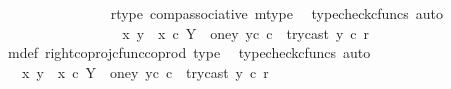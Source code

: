\begin{isabellebody}
\ \ \ \ \ \ \ \ \ \ \ \ \ \ \isamarkupfalse%
\ r{\isacharunderscore}{\kern0pt}type\ comp{\isacharunderscore}{\kern0pt}associative{}\ m{\isacharunderscore}{\kern0pt}type\ \isamarkupfalse%
\ {\isacharparenleft}{\kern0pt}typecheck{\isacharunderscore}{\kern0pt}cfuncs{\isacharcomma}{\kern0pt}\ auto{\isacharparenright}{\kern0pt}\isanewline
\ \ \ \ \ \ \ \ \ \ \ \ \isamarkupfalse%
\ \isamarkupfalse%
\ {\isachardoublequoteopen}{\isachardot}{\kern0pt}{\isachardot}{\kern0pt}{\isachardot}{\kern0pt}\ {\isacharequal}{\kern0pt}\ {\isacharparenleft}{\kern0pt}{\isacharparenleft}{\kern0pt}{\isasymlangle}x{}{\isacharcomma}{\kern0pt}\ y{}{\isasymrangle}\ {\isasymamalg}\ {\isasymlangle}x{}\ {\isasymcirc}\isactrlsub c\ {\isasymbeta}\isactrlbsub Y\ {\isasymsetminus}\ {\isacharparenleft}{\kern0pt}one{\isacharcomma}{\kern0pt}y{}{\isacharparenright}{\kern0pt}\isactrlesub {\isacharcomma}{\kern0pt}\ y{}\isactrlsup c{\isasymrangle}{\isacharparenright}{\kern0pt}\ {\isasymcirc}\isactrlsub c\ \ try{\isacharunderscore}{\kern0pt}cast\ y{}{\isacharparenright}{\kern0pt}\ {\isasymcirc}\isactrlsub c\ r{\isachardoublequoteclose}\isanewline
\ \ \ \ \ \ \ \ \ \ \ \ \ \ \isamarkupfalse%
\ m{\isacharunderscore}{\kern0pt}def\ right{\isacharunderscore}{\kern0pt}coproj{\isacharunderscore}{\kern0pt}cfunc{\isacharunderscore}{\kern0pt}coprod\ type{}\ \isamarkupfalse%
\ {\isacharparenleft}{\kern0pt}typecheck{\isacharunderscore}{\kern0pt}cfuncs{\isacharcomma}{\kern0pt}\ auto{\isacharparenright}{\kern0pt}\isanewline
\ \ \ \ \ \ \ \ \ \ \ \ \isamarkupfalse%
\ \isamarkupfalse%
\ {\isachardoublequoteopen}{\isachardot}{\kern0pt}{\isachardot}{\kern0pt}{\isachardot}{\kern0pt}\ {\isacharequal}{\kern0pt}\ {\isacharparenleft}{\kern0pt}{\isasymlangle}x{}{\isacharcomma}{\kern0pt}\ y{}{\isasymrangle}\ {\isasymamalg}\ {\isasymlangle}x{}\ {\isasymcirc}\isactrlsub c\ {\isasymbeta}\isactrlbsub Y\ {\isasymsetminus}\ {\isacharparenleft}{\kern0pt}one{\isacharcomma}{\kern0pt}y{}{\isacharparenright}{\kern0pt}\isactrlesub {\isacharcomma}{\kern0pt}\ y{}\isactrlsup c{\isasymrangle}{\isacharparenright}{\kern0pt}\ {\isasymcirc}\isactrlsub c\ \ {\isacharparenleft}{\kern0pt}try{\isacharunderscore}{\kern0pt}cast\ y{}\ {\isasymcirc}\isactrlsub c\ r{\isacharparenright}{\kern0pt}{\isachardoublequoteclose}\isanewline
\ \ \ \ \ \ \ \ \ \ \ \ \ \ \isamarkupfalse%

\end{isabellebody}
